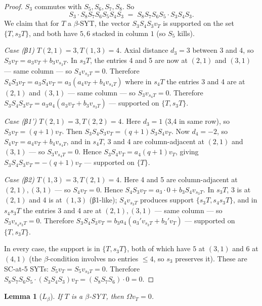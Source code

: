 \documentclass[11pt]{article}
\newtheorem{lemma}{Lemma}
\begin{document}
\begin{proof}
$S_3$ commutes with $S_5, S_6, S_7, S_8$. So
\[
S_3 \cdot S_8 S_7 S_6 S_5 S_4 S_3 \;=\; S_8 S_7 S_6 S_5 \cdot S_3 S_4 S_3.
\]
We claim that for $T$ a $\beta$-SYT, the vector $S_3 S_4 S_3 v_T$ is supported on
the set $\{T, s_3 T\}$, and both have $5,6$ stacked in column $1$ (so $S_5$ kills).

\emph{Case (β1) $T(2,1)=3, T(1,3)=4$.} Axial distance $d_3 = 3$ between 3 and 4,
so $S_3 v_T = a_3 v_T + b_3 v_{s_3 T}$. In $s_3 T$, the entries 4 and 5 are now at
$(2,1)$ and $(3,1)$ — same column — so $S_4 v_{s_3 T} = 0$. Therefore
$S_4 S_3 v_T = a_3 S_4 v_T = a_3 (a_4 v_T + b_4 v_{s_4 T})$ where in $s_4 T$ the
entries 3 and 4 are at $(2,1)$ and $(3,1)$ — same column — so $S_3 v_{s_4 T} = 0$.
Therefore $S_3 S_4 S_3 v_T = a_3 a_4 (a_3 v_T + b_3 v_{s_3 T})$ —
supported on $\{T, s_3 T\}$.

\emph{Case (β1') $T(2,1)=3, T(2,2)=4$.} Here $d_3 = 1$ (3,4 in same row), so
$S_3 v_T = (q+1) v_T$. Then $S_3 S_4 S_3 v_T = (q+1) S_3 S_4 v_T$. Now
$d_4 = -2$, so $S_4 v_T = a_4 v_T + b_4 v_{s_4 T}$, and in $s_4 T$, 3 and 4 are
column-adjacent at $(2,1)$ and $(3,1)$ — so $S_3 v_{s_4 T} = 0$. Hence
$S_3 S_4 v_T = a_4 (q+1) v_T$, giving $S_3 S_4 S_3 v_T = -(q+1) v_T$ —
supported on $\{T\}$.

\emph{Case (β2) $T(1,3)=3, T(2,1)=4$.} Here 4 and 5 are column-adjacent at $(2,1),
(3,1)$ — so $S_4 v_T = 0$. Hence $S_4 S_3 v_T = a_3 \cdot 0 + b_3 S_4 v_{s_3 T}$.
In $s_3 T$, 3 is at $(2,1)$ and 4 is at $(1,3)$ (β1-like); $S_4 v_{s_3 T}$ produces
support $\{s_3 T, s_4 s_3 T\}$, and in $s_4 s_3 T$ the entries 3 and 4 are at $(2,1),
(3,1)$ — same column — so $S_3 v_{s_4 s_3 T} = 0$. Therefore $S_3 S_4 S_3 v_T =
b_3 a_4 (a_3' v_{s_3 T} + b_3' v_T)$ — supported on $\{T, s_3 T\}$.

In every case, the support is in $\{T, s_3 T\}$, both of which have $5$ at $(3,1)$
and $6$ at $(4,1)$ (the $\beta$-condition involves no entries $\le 4$, so $s_3$
preserves it). These are SC-at-5 SYTs: $S_5 v_T = S_5 v_{s_3 T} = 0$. Therefore
$S_8 S_7 S_6 S_5 \cdot (S_3 S_4 S_3) v_T = (S_8 S_7 S_6) \cdot 0 = 0$.
\end{proof}

\begin{lemma}[$L_\beta$] \label{lem:Lbeta}
If $T$ is a $\beta$-SYT, then $\Omega v_T = 0$.
\end{lemma}
\end{document}
